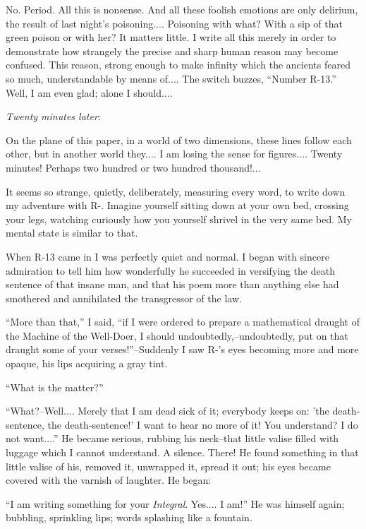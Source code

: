 \documentclass[11pt,openany]{book}
\begin{document}
No. Period. All this is nonsense. And all these foolish emotions are only delirium, the result of last night's poisoning.... Poisoning with what? With a sip of that green poison or with her? It matters little. I write all this merely in order to demonstrate how strangely the precise and sharp human reason may become confused. This reason, strong enough to make infinity which the ancients feared so much, understandable by means of.... The switch buzzes, ``Number R-13.'' Well, I am even glad; alone I should....

\emph{Twenty minutes later}:

On the plane of this paper, in a world of two dimensions, these lines follow each other, but in another world they.... I am losing the sense for figures.... Twenty minutes! Perhaps two hundred or two hundred thousand!...

It seems so strange, quietly, deliberately, measuring every word, to write down my adventure with R-. Imagine yourself sitting down at your own bed, crossing your legs, watching curiously how you yourself shrivel in the very same bed. My mental state is similar to that.

When R-13 came in I was perfectly quiet and normal. I began with sincere admiration to tell him how wonderfully he succeeded in versifying the death sentence of that insane man, and that his poem more than anything else had smothered and annihilated the transgressor of the law.

``More than that,'' I said, ``if I were ordered to prepare a mathematical draught of the Machine of the Well-Doer, I should undoubtedly,--undoubtedly, put on that draught some of your verses!''--Suddenly I saw R-'s eyes becoming more and more opaque, his lips acquiring a gray tint.

``What is the matter?''

``What?--Well.... Merely that I am dead sick of it; everybody keeps on: 'the death-sentence, the death-sentence!' I want to hear no more of it! You understand? I do not want....'' He became serious, rubbing his neck--that little valise filled with luggage which I cannot understand. A silence. There! He found something in that little valise of his, removed it, unwrapped it, spread it out; his eyes became covered with the varnish of laughter. He began:

``I am writing something for your \emph{Integral}. Yes.... I am!'' He was himself again; bubbling, sprinkling lips; words splashing like a fountain.
\end{document}
